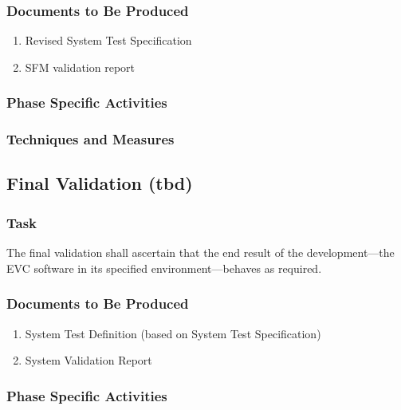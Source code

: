 \documentclass{template/openetcs_report}
\begin{document}
\subsubsection{Documents to Be Produced}
\label{sec:sfm-valid-docum-be-prod}

\begin{enumerate}
\item Revised System Test Specification
\item SFM validation report
\end{enumerate}

\subsubsection{Phase Specific Activities}
\label{sec:sfm-valid-phase-spec-activ}

\tbd{}

\subsubsection{Techniques and Measures}
\label{sec:sfm-valid-techniques-measures}

\tbd{}

\subsection{Final Validation (tbd)}
\label{sec:final-validation}

\subsubsection{Task}
\label{sec:final-valid-task}

The final validation shall ascertain that the end result of the
development---the EVC software in its specified environment---behaves
as required. 

\subsubsection{Documents to Be Produced}
\label{sec:final-valid-docum-be-prod}

\begin{enumerate}
\item System Test Definition (based on System Test Specification)
\item System Validation Report
\end{enumerate}

\subsubsection{Phase Specific Activities}
\label{sec:final-valid-phase-spec-activ}
\end{document}
